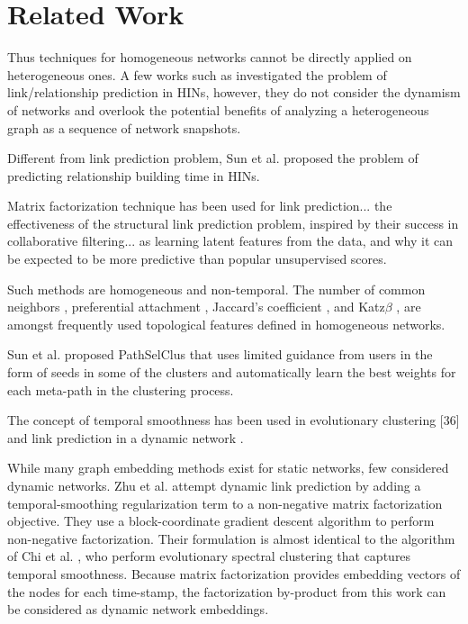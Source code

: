 \section{Related Work}

\cite{Zhu2016} \cite{sun2011pathsim} \cite{Sun:2012:HRP:2124295.2124373} \cite{huang2016meta}
\cite{wang2016relsim} \cite{sun2013pathselclus} \cite{sun2011ASONAM} \cite{Yang2012} \cite{liben2007link}

Thus techniques for homogeneous networks \cite{liben2007link,wang2007local,lichtenwalter2010new,leroy2010cold,al2006link} cannot be directly applied on heterogeneous ones. A few works such as \cite{sun2011pathsim,sun2011ASONAM} investigated the problem of link/relationship prediction in HINs, however, they do not consider the dynamism of networks and overlook the potential benefits of analyzing a heterogeneous graph as a sequence of network snapshots.

Different from link prediction problem, Sun et al. \cite{Sun:2012:HRP:2124295.2124373} proposed the problem of predicting relationship building time in HINs.

Matrix factorization technique \cite{menon2011link} has been used for link prediction... the effectiveness of the structural link prediction problem, inspired by their success in collaborative filtering... as learning latent features from the data, and why it can be expected to be more predictive than popular unsupervised scores. 

Such methods are homogeneous and non-temporal. The number of common neighbors \cite{newman2001clustering}, preferential attachment \cite{newman2001clustering}, Jaccard's coefficient \cite{liben2007link}, and Katz$\beta$ \cite{katz1953new}, are amongst frequently used topological features defined in homogeneous networks.


Sun et al. proposed PathSelClus \cite{sun2013pathselclus} that uses limited guidance from users in the form of seeds in some of the clusters and automatically learn the best weights for each meta-path in the clustering process.

The concept of temporal smoothness has been used in evolutionary clustering [36] and link prediction in a dynamic network \cite{Zhu2016}.

While many graph embedding methods exist for static networks, few considered dynamic networks. Zhu et al. \cite{Zhu2016} attempt dynamic link prediction by adding a temporal-smoothing regularization term to a non-negative matrix factorization objective. They use a block-coordinate gradient descent algorithm to perform non-negative factorization. Their formulation is almost identical to the algorithm of Chi et al. \cite{Chi:2007}, who perform evolutionary spectral clustering that captures temporal smoothness. Because matrix factorization provides embedding vectors of the nodes for each time-stamp, the factorization by-product from this work can be considered as dynamic network embeddings.



